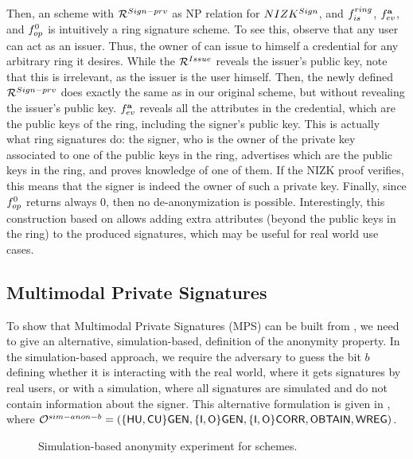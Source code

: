 Then, an \UAS scheme with $\mathcal{R}^{Sign-prv}$ as NP relation for
$NIZK^{Sign}$, and $f_{is}^{ring}$, $f_{ev}^{\mathbf{a}}$, and $f_{op}^0$ is
intuitively a ring signature scheme. To see this, observe that any user can
act as an issuer. Thus, the owner of \usk can issue to himself a credential
for any arbitrary ring it desires. While the $\mathcal{R}^{Issue}$ reveals the
issuer's public key, note that this is irrelevant, as the issuer is the user
himself. Then, the newly defined $\mathcal{R}^{Sign-prv}$ does exactly the same
as in our original \UAS scheme, but without revealing the issuer's public key.
$f_{ev}^{\mathbf{a}}$ reveals all the attributes in the credential, which are
the public keys of the ring, including the signer's public key. This is actually
what ring signatures do: the signer, who is the owner of the private key
associated to one of the public keys in the ring, advertises which are the
public keys in the ring, and proves knowledge of one of them. If the NIZK
proof verifies, this means that the signer is indeed the owner of such a private
key. Finally, since $f_{op}^0$ returns always $0$, then no de-anonymization is
possible.
%
Interestingly, this construction based on \UAS allows adding extra attributes
(beyond the public keys in the ring) to the produced signatures, which may be
useful for real world use cases.

\subsection{Multimodal Private Signatures}
\label{ssec:uas-mps}

To show that Multimodal Private Signatures (MPS) \needcite can be built from
\UAS, we need to give an alternative, simulation-based, definition of the
anonymity property. In the simulation-based approach, we require the adversary
to guess the bit $b$ defining whether it is interacting with the real world,
where it gets signatures by real users, or with a simulation, where all
signatures are simulated and do not contain information about the signer.
This alternative formulation is given in , where
$\mathcal{O}^{sim-anon-b} = (\lbrace\mathsf{HU},\mathsf{CU}\rbrace\mathsf{GEN},\lbrace\mathsf{I},\mathsf{O}\rbrace\mathsf{GEN},\lbrace\mathsf{I},
\mathsf{O}\rbrace\mathsf{CORR},\mathsf{OBTAIN},\mathsf{WREG})$.

\begin{figure}[htp!]

  \centering
  
  \caption{Simulation-based anonymity experiment for \UAS schemes.}
  \label{fig:exp-uas-simanon}
\end{figure}

